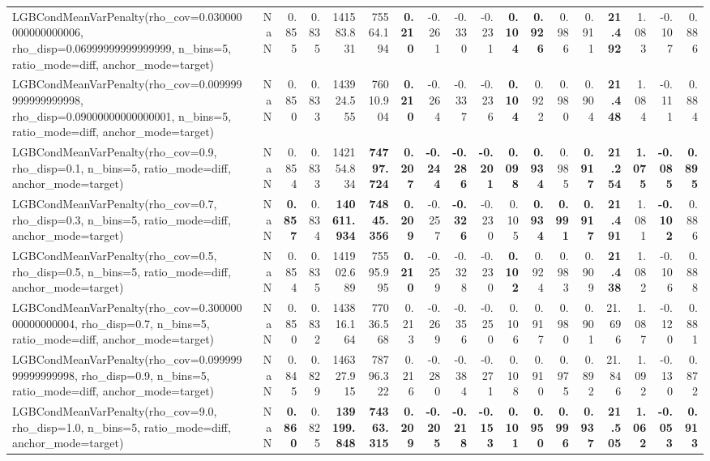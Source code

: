 \documentclass[11pt]{article}
\theoremstyle{plain}
\theoremstyle{definition}
\newcommand{\1}{\mathbf{1}}
\begin{document}
\begin{table}[htbp]
{\begin{tabular}{lrrrrrrrrrrrrrrrrr}
LGBCondMeanVarPenalty(rho\_cov=0.030000000000000006, rho\_disp=0.06999999999999999, n\_bins=5, ratio\_mode=diff, anchor\_mode=target) & NaN & 0.855 & 0.835 & 141583.831 & 75564.194 & \textbf{0.210} & -0.261 & -0.330 & -0.231 & \textbf{0.104} & \textbf{0.926} & 0.986 & 0.911 & \textbf{21.492} & 1.083 & -0.107 & 0.886 \\
LGBCondMeanVarPenalty(rho\_cov=0.009999999999999998, rho\_disp=0.09000000000000001, n\_bins=5, ratio\_mode=diff, anchor\_mode=target) & NaN & 0.850 & 0.833 & 143924.555 & 76010.904 & \textbf{0.210} & -0.264 & -0.337 & -0.236 & \textbf{0.104} & 0.922 & 0.980 & 0.904 & \textbf{21.448} & 1.084 & -0.111 & 0.884 \\
LGBCondMeanVarPenalty(rho\_cov=0.9, rho\_disp=0.1, n\_bins=5, ratio\_mode=diff, anchor\_mode=target) & NaN & 0.854 & 0.833 & 142154.834 & \textbf{74797.724} & \textbf{0.207} & \textbf{-0.244} & \textbf{-0.286} & \textbf{-0.201} & \textbf{0.098} & \textbf{0.934} & 0.985 & \textbf{0.917} & \textbf{21.254} & \textbf{1.075} & \textbf{-0.085} & \textbf{0.895} \\
LGBCondMeanVarPenalty(rho\_cov=0.7, rho\_disp=0.3, n\_bins=5, ratio\_mode=diff, anchor\_mode=target) & NaN & \textbf{0.857} & 0.834 & \textbf{140611.934} & \textbf{74845.356} & \textbf{0.209} & -0.257 & \textbf{-0.326} & -0.230 & 0.105 & \textbf{0.934} & \textbf{0.991} & \textbf{0.917} & \textbf{21.491} & 1.081 & \textbf{-0.102} & 0.886 \\
LGBCondMeanVarPenalty(rho\_cov=0.5, rho\_disp=0.5, n\_bins=5, ratio\_mode=diff, anchor\_mode=target) & NaN & 0.854 & 0.835 & 141902.689 & 75595.995 & \textbf{0.210} & -0.259 & -0.328 & -0.230 & \textbf{0.102} & 0.924 & 0.983 & 0.909 & \textbf{21.438} & 1.082 & -0.106 & 0.888 \\
LGBCondMeanVarPenalty(rho\_cov=0.30000000000000004, rho\_disp=0.7, n\_bins=5, ratio\_mode=diff, anchor\_mode=target) & NaN & 0.850 & 0.832 & 143816.164 & 77036.568 & 0.213 & -0.269 & -0.356 & -0.250 & 0.106 & 0.917 & 0.980 & 0.901 & 21.696 & 1.087 & -0.120 & 0.881 \\
LGBCondMeanVarPenalty(rho\_cov=0.09999999999999998, rho\_disp=0.9, n\_bins=5, ratio\_mode=diff, anchor\_mode=target) & NaN & 0.845 & 0.829 & 146327.915 & 78796.322 & 0.216 & -0.280 & -0.384 & -0.271 & 0.108 & 0.910 & 0.975 & 0.892 & 21.846 & 1.092 & -0.130 & 0.872 \\
LGBCondMeanVarPenalty(rho\_cov=9.0, rho\_disp=1.0, n\_bins=5, ratio\_mode=diff, anchor\_mode=target) & NaN & \textbf{0.860} & 0.825 & \textbf{139199.848} & \textbf{74363.315} & \textbf{0.209} & \textbf{-0.205} & \textbf{-0.218} & \textbf{-0.153} & \textbf{0.101} & \textbf{0.950} & \textbf{0.996} & \textbf{0.937} & \textbf{21.505} & \textbf{1.062} & \textbf{-0.053} & \textbf{0.913} \\

\end{tabular}}
\end{table}
\end{document}
